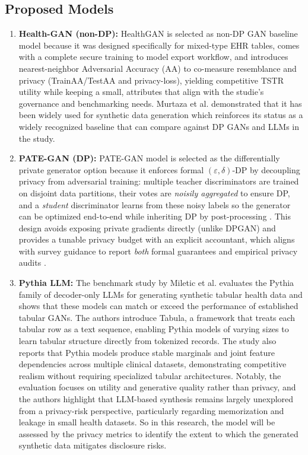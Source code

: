 \documentclass[master,proposal,extern,palatino]{rgseThesis}
\begin{document}
\subsection{Proposed Models}
\begin{enumerate}\itemsep0.25em
  \item \textbf{Health-GAN (non-DP):} HealthGAN is selected as non-DP GAN baseline model because it was designed specifically for mixed-type EHR tables, comes with a complete secure training to model export workflow, and introduces nearest-neighbor Adversarial Accuracy (AA) to co-measure resemblance and privacy (TrainAA/TestAA and privacy-loss), yielding competitive TSTR utility while keeping a small, attributes that align with the studie's governance and benchmarking needs. Murtaza et al.\cite{Murtaza2023} demonstrated that it has been widely used for synthetic data generation \cite{healthgan}\cite{yale2020synthesizing}\cite{dash2020medical} which reinforces its status as a widely recognized baseline that can compare against DP GANs and LLMs in the study.
  \item \textbf{PATE-GAN (DP):} \textsc{PATE{-}GAN} model is selected as the differentially private generator option because it enforces formal $(\varepsilon,\delta)$-DP by decoupling privacy from adversarial training: multiple teacher discriminators are trained on disjoint data partitions, their votes are \emph{noisily aggregated} to ensure DP, and a \emph{student} discriminator learns from these noisy labels so the generator can be optimized end-to-end while inheriting DP by post-processing \cite{pategan}. This design avoids exposing private gradients directly (unlike DPGAN) and provides a tunable privacy budget with an explicit accountant, which aligns with survey guidance to report \emph{both} formal guarantees and empirical privacy audits \cite{hernandez2022synthetic,Murtaza2023}.
  \item \textbf{Pythia LLM:} The benchmark study by Miletic et al. \cite{Miletic2024} evaluates the Pythia family of decoder-only LLMs for generating synthetic tabular health data and shows that these models can match or exceed the performance of established tabular GANs. The authors introduce Tabula, a framework that treats each tabular row as a text sequence, enabling Pythia models of varying sizes to learn tabular structure directly from tokenized records. The study also reports that Pythia models produce stable marginals and joint feature dependencies across multiple clinical datasets, demonstrating competitive realism without requiring specialized tabular architectures. Notably, the evaluation focuses on utility and generative quality rather than privacy, and the authors highlight that LLM-based synthesis remains largely unexplored from a privacy-risk perspective, particularly regarding memorization and leakage in small health datasets. So in this research, the model will be assessed by the privacy metrics to identify the extent to which the generated synthetic data mitigates disclosure risks.
\end{enumerate}
\end{document}
